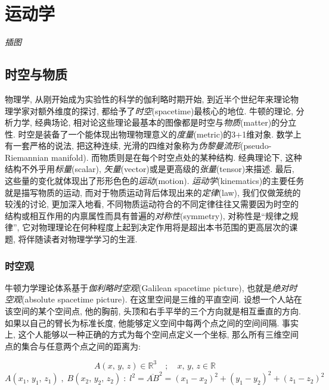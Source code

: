 \chapter{运动学}\label{2}

\emph{插图}



\section{时空与物质}\label{2-1}

物理学, 从刚开始成为实验性的科学的伽利略时期开始, 到近半个世纪年来理论物理学家对额外维度的探讨, 都给予了\emph{时空}(spacetime)最核心的地位. 牛顿的理论, 分析力学, 经典场论, 相对论这些理论最基本的图像都是时空与\emph{物质}(matter)的分立性. 时空是装备了一个能体现出物理物理意义的\emph{度量}(metric)的3+1维对象. 数学上有一套严格的说法, 把这种连续, 光滑的四维对象称为\emph{伪黎曼流形}(pseudo-Riemannian manifold). 而物质则是在每个时空点处的某种结构. 经典理论下, 这种结构不外乎用\emph{标量}(scalar), \emph{矢量}(vector)或是更高级的\emph{张量}(tensor)来描述. 最后, 这些量的变化就体现出了形形色色的\emph{运动}(motion). \emph{运动学}(kinematics)的主要任务就是描写物质的运动, 而对于物质运动背后体现出来的\emph{定律}(law), 我们仅做笼统的较浅的讨论, 更加深入地看, 不同物质运动符合的不同定律往往又需要因为时空的结构或相互作用的内禀属性而具有普遍的\emph{对称性}(symmetry), 对称性是``规律之规律'', 它对物理理论在何种程度上起到决定作用将是超出本书范围的更高层次的课题, 将伴随读者对物理学学习的生涯.

\subsection{时空观}\label{2-1-1}

牛顿力学理论体系基于\emph{伽利略时空观}(Galilean spacetime picture), 也就是\emph{绝对时空观}(absolute spacetime picture). 在这里空间是三维的平直空间. 设想一个人站在该空间的某个空间点, 他的胸前, 头顶和右手平举的三个方向就是相互垂直的方向. 如果以自己的臂长为标准长度, 他能够定义空间中每两个点之间的空间间隔. 事实上, 这个人能够以一种正确的方式为每个空间点定义一个坐标, 那么所有三维空间点的集合与任意两个点之间的距离为:

\[A(x,\,y,\,z)\in\mathbb{R}^3 \quad;\quad x,\,y,\,z\in\mathbb{R}\]
\[A(x_1,\,y_1,\,z_1)\;,\;B(x_2,\,y_2,\,z_2)\;:\;l^2=\overline{AB}^2=(x_1-x_2)^2+(y_1-y_2)^2+(z_1-z_2)^2\]

